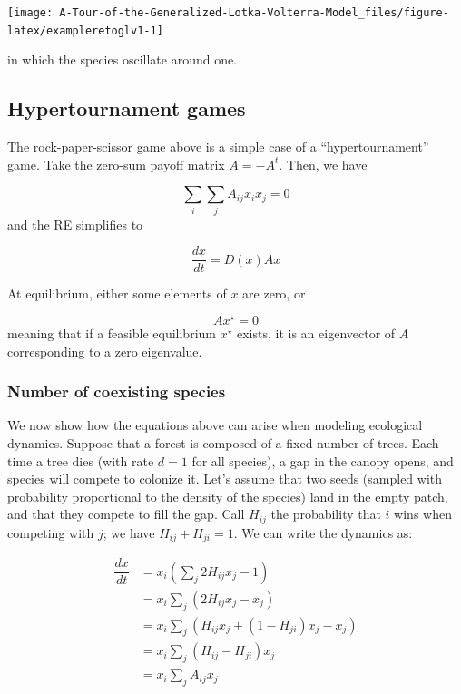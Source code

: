 \documentclass[]{book}
\begin{document}
\begin{center}\texttt{[image: A-Tour-of-the-Generalized-Lotka-Volterra-Model\_files/figure-latex/exampleretoglv1-1]} \end{center}

in which the species oscillate around one.

\hypertarget{hypertournament-games}{%
\subsection{Hypertournament games}\label{hypertournament-games}}

The rock-paper-scissor game above is a simple case of a ``hypertournament'' game. Take the zero-sum payoff matrix \(A = -A^t\). Then, we have

\[
\sum_i \sum_j A_{ij} x_i x_j = 0
\]
and the RE simplifies to

\[
\dfrac{d x}{dt} = D(x) A x
\]

At equilibrium, either some elements of \(x\) are zero, or

\[
A x^\star = 0
\]
meaning that if a feasible equilibrium \(x^\star\) exists, it is an eigenvector of \(A\) corresponding to a zero eigenvalue.

\hypertarget{number-of-coexisting-species}{%
\subsubsection{Number of coexisting species}\label{number-of-coexisting-species}}

We now show how the equations above can arise when modeling ecological dynamics. Suppose that a forest is composed of a fixed number of trees. Each time a tree dies (with rate \(d = 1\) for all species), a gap in the canopy opens, and species will compete to colonize it. Let's assume that two seeds (sampled with probability proportional to the density of the species) land in the empty patch, and that they compete to fill the gap. Call \(H_{ij}\) the probability that \(i\) wins when competing with \(j\); we have \(H_{ij} + H_{ji} = 1\). We can write the dynamics \citep{grilli2017higher} as:

\[
\begin{aligned}
  \dfrac{d x}{dt} &= x_i \left(\sum_j 2 H_{ij} x_j - 1 \right) \\
  &=x_i \sum_j (2 H_{ij} x_j - x_j) \\
  &= x_i \sum_j (H_{ij} x_j  + (1 - H_{ji}) x_j - x_j) \\
  &= x_i \sum_j (H_{ij} - H_{ji}) x_j \\
  &= x_i  \sum_j A_{ij} x_j
\end{aligned}
\]
\end{document}
